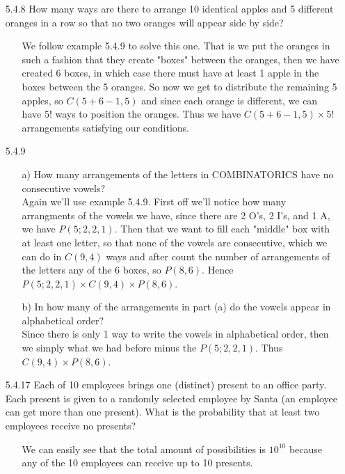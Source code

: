 \documentclass[12pt]{article}
\begin{document}
\begin{enumerate}
\item[5.4.8] How many ways are there to arrange 10 identical apples and 5 different oranges in a row so that no two oranges will appear side by side?
\begin{enumerate}
\item[] We follow example 5.4.9 to solve this one. That is we put the oranges in such a fashion that they
create "boxes" between the oranges, then we have created 6 boxes, in which case there must have at least 1 apple 
in the boxes between the 5 oranges. So now we get to distribute the remaining 5 apples, so $C(5 + 6 - 1, 5)$ and
since each orange is different, we can have $5!$ ways to position the oranges. Thus we have
$C(5 + 6 - 1, 5) \times 5!$ arrangements satisfying our conditions.
\end{enumerate}

\item[5.4.9]
\begin{enumerate}
\item[a)] How many arrangements of the letters in COMBINATORICS have no consecutive vowels? \\ 
Again we'll use example 5.4.9. First off we'll notice how many arrangments of the vowels we have, 
since there are 2 O's, 2 I's, and 1 A, we have $P(5; 2, 2, 1)$. Then that we want to fill each "middle" box with
at least one letter, so that none of the vowels are consecutive, which we can do in $C(9, 4)$ ways and after
count the number of arrangements of the letters any of the 6 boxes, so $P(8, 6)$. Hence 
$P(5; 2, 2, 1) \times C(9, 4) \times P(8, 6)$.
\item[b)] In how many of the arrangements in part (a) do the vowels appear in alphabetical order? \\
Since there is only 1 way to write the vowels in alphabetical order, then we simply what we had
before minus the $P(5; 2, 2, 1)$. Thus $C(9, 4) \times P(8, 6)$.
\end{enumerate}


\item[5.4.17] Each of 10 employees brings one (distinct) present to an office party. Each present is given to a randomly selected employee by Santa (an employee can get more than one present). What is the probability that at least two employees receive no presents?
\begin{enumerate}
\item[] We can easily see that the total amount of possibilities is $10^{10}$ because any of the 10 employees
can receive up to 10 presents.
\end{enumerate}


\end{enumerate}
\end{document}
